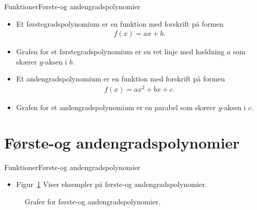 \begin{frame}{Funktioner}{Første-og andengradspolynomier}
\begin{itemize}
		\setlength\itemsep{1em}
	\item<1-> Et førstegradspolynomium er en funktion med forskrift på formen
	\begin{align*}
	f(x)=ax+b.
	\end{align*}
	\item<2-> Grafen for et førstegradspolynomium er en ret linje med hældning $a$ som skærer $y$-aksen i $b$.
	\item<3-> Et andengradspolynomium er en funktion med forskrift på formen
	\begin{align*}
	f(x)=ax^2+bx+c.
	\end{align*}
	\item<4-> Grafen for et andengradspolynomium er en parabel som skærer $y$-aksen i $c$.
	
\end{itemize}
\end{frame}
\section{Første-og andengradspolynomier}
\begin{frame}{Funktioner}{Første-og andengradspolynomier}
\begin{itemize}
	\item<1-> Figur~\ref{fig:fun3} Viser eksempler på første-og andengradspolynomier.
\end{itemize}
\begin{figure}
			\centering
\caption{Grafer for første-og andengradspolynomier.}
\label{fig:fun3}
\end{figure}
\end{frame}

